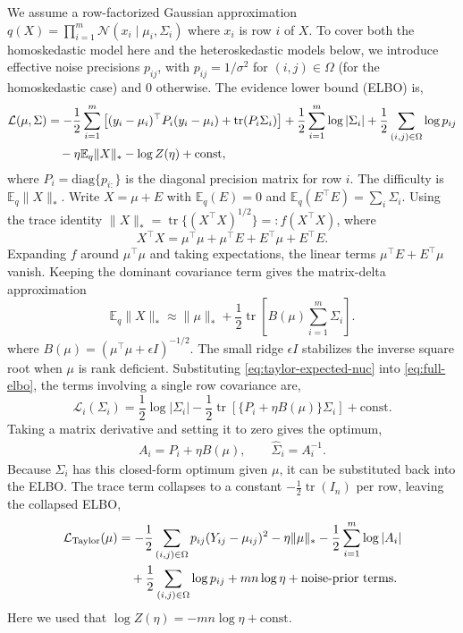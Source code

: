 \documentclass[11pt]{article}
\begin{document}
We assume a row-factorized Gaussian approximation $ q(X) = \prod_{i=1}^m \mathcal{N}(x_i\mid \mu_i,\Sigma_i)$ where $x_i$ is row $i$ of $X$. To cover both the homoskedastic model here and the heteroskedastic models below, we introduce effective noise precisions $p_{ij}$, with $p_{ij} = 1/\sigma^2$ for $(i,j)\in\Omega$ (for the homoskedastic case) and $0$ otherwise. The evidence lower bound (ELBO) is,
\begin{align} \mathcal{L}(\mu,\Sigma) &= -\frac{1}{2} \sum_{i=1}^m \left[ (y_i-\mu_i)^\top P_i (y_i-\mu_i) + \operatorname{tr}(P_i\Sigma_i) \right] + \frac{1}{2}\sum_{i=1}^m \log|\Sigma_i| + \frac12 \sum_{(i,j)\in\Omega}\log p_{ij} \notag\\ &\quad - \eta\mathbb{E}_q\|X\|_* - \log Z(\eta) + \mathrm{const}, \label{eq:full-elbo}
\end{align}
where $P_i = \text{diag}\{p_{i:}\}$ is the diagonal precision matrix for row $i$. The difficulty is $\mathbb{E}_q\|X\|_*$.  Write
$X=\mu+E$ with $\mathbb{E}_q(E)=0$ and
$\mathbb{E}_q(E^\top E)=\sum_i\Sigma_i$.  Using the trace identity
$\|X\|_*=\operatorname{tr}\{(X^\top X)^{1/2}\} =: f(X^\top X)$, where
\begin{equation} X^\top X = \mu^\top\mu + \mu^\top E + E^\top\mu + E^\top E.
\end{equation}
Expanding $f$ around $\mu^\top\mu$ and taking expectations, the
linear terms $\mu^\top E+E^\top\mu$ vanish.  Keeping the dominant covariance
term gives the matrix-delta approximation
\begin{equation} \mathbb{E}_q\|X\|_* \approx \|\mu\|_* + \frac{1}{2} \operatorname{tr} \left[ B(\mu) \sum_{i=1}^m \Sigma_i \right]. \label{eq:taylor-expected-nuc}
\end{equation}
where $B(\mu) = (\mu^\top\mu+\epsilon I)^{-1/2}$. The small ridge $\epsilon I$ stabilizes the inverse square root when $\mu$ is
rank deficient. Substituting \eqref{eq:taylor-expected-nuc} into \eqref{eq:full-elbo}, the terms involving a single row covariance are,
\begin{equation} \mathcal{L}_i(\Sigma_i) = \frac{1}{2}\log|\Sigma_i| - \frac{1}{2} \operatorname{tr} \left[ \{P_i+\eta B(\mu)\}\Sigma_i \right] + \mathrm{const}.
\end{equation}
Taking a matrix derivative and setting it to zero gives the optimum,
\begin{align}
A_i = P_i+\eta B(\mu), \qquad \hat{\Sigma}_i = A_i^{-1}. \label{eq:taylor-row-precision}
\end{align}
Because $\Sigma_i$ has this closed-form optimum given $\mu$, it can be substituted
back into the ELBO.  The trace term collapses to a constant
$-\frac{1}{2}\operatorname{tr}(I_n)$ per row, leaving the collapsed ELBO,
\begin{align} \mathcal{L}_{\mathrm{Taylor}}(\mu) &= -\frac{1}{2} \sum_{(i,j)\in\Omega} p_{ij}(Y_{ij}-\mu_{ij})^2 - \eta\|\mu\|_* - \frac{1}{2}\sum_{i=1}^m \log |A_i| \notag\\ &\quad + \frac12 \sum_{(i,j)\in\Omega}\log p_{ij} + mn\log\eta + \text{noise-prior terms}. \label{eq:taylor-elbo}
\end{align}
Here we used that $\log Z(\eta)=-mn\log\eta+\mathrm{const}$.
\end{document}
